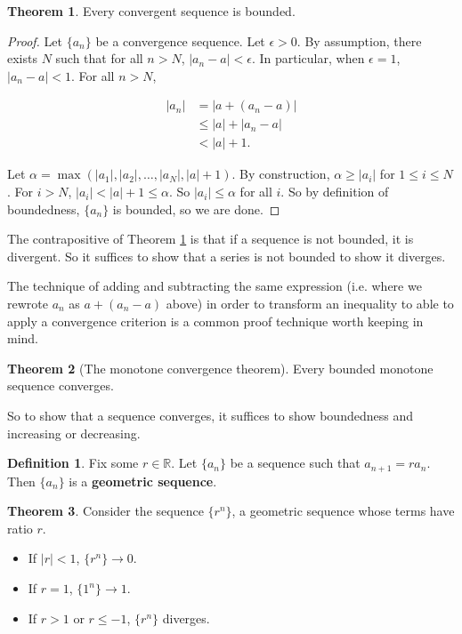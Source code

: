 \documentclass{article}
\theoremstyle{definition}
\newtheorem{definition}{Definition}[section]
\newtheorem{theorem}{Theorem}[section]
\begin{document}
\begin{theorem} \label{convergent-bounded}
Every convergent sequence is bounded.
\end{theorem}

\begin{proof}
Let $\{a_n\}$ be a convergence sequence. Let $\epsilon > 0$. By assumption, there exists $N$ such that for all $n > N$, $|a_n - a| < \epsilon$. In particular, when $\epsilon = 1$, $|a_n - a| < 1$. For all $n > N$, 

\begin{align*}
|a_n| & = |a + (a_n - a)| \\
& \leq |a| + |a_n - a| \\
& < |a| + 1.
\end{align*}

Let $\alpha = \max(|a_1|, |a_2|, \ldots, |a_N|, |a| + 1)$. By construction, $\alpha \geq |a_i|$ for $1 \leq i \leq N$. For $i > N$, $|a_i| < |a| + 1 \leq \alpha$. So $|a_i| \leq \alpha$ for all $i$. So by definition of boundedness, $\{a_n\}$ is bounded, so we are done.
\end{proof}

The contrapositive of Theorem \ref{convergent-bounded} is that if a sequence is not bounded, it is divergent. So it suffices to show that a series is not bounded to show it diverges.

The technique of adding and subtracting the same expression (i.e. where we rewrote $a_n$ as $a + (a_n - a)$ above) in order to transform an inequality to able to apply a convergence criterion is a common proof technique worth keeping in mind.

\begin{theorem}[The monotone convergence theorem]
Every bounded monotone sequence converges.
\end{theorem}

So to show that a sequence converges, it suffices to show boundedness and increasing or decreasing.

\begin{definition}
Fix some $r \in \mathbb{R}$. Let $\{a_n\}$ be a sequence such that $a_{n+1} = ra_n$. Then $\{a_n\}$ is a \textbf{geometric sequence}.
\end{definition}

\begin{theorem}
Consider the sequence $\{r^n\}$, a geometric sequence whose terms have ratio $r$. 

\begin{itemize}
\item If $|r| < 1$, $\{r^n\} \to 0$.
\item If $r = 1$, $\{1^n\} \to 1$.
\item If $r > 1$ or $r \leq -1$, $\{r^n\}$ diverges.
\end{itemize}

\end{theorem}
\end{document}
